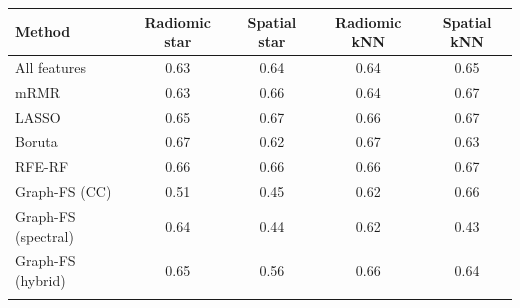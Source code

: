 \begin{tabular}{@{}lcccc@{}}
\toprule
Method & Radiomic star & Spatial star & Radiomic kNN & Spatial kNN \\
\midrule
All features & 0.63 & 0.64 & 0.64 & 0.65 \\
mRMR & 0.63 & 0.66 & 0.64 & 0.67 \\
LASSO & 0.65 & 0.67 & 0.66 & 0.67 \\
Boruta & 0.67 & 0.62 & 0.67 & 0.63 \\
RFE-RF & 0.66 & 0.66 & 0.66 & 0.67 \\
Graph-FS (CC) & 0.51 & 0.45 & 0.62 & 0.66 \\
Graph-FS (spectral) & 0.64 & 0.44 & 0.62 & 0.43 \\
Graph-FS (hybrid) & 0.65 & 0.56 & 0.66 & 0.64 \\
\botrule
\end{tabular}
